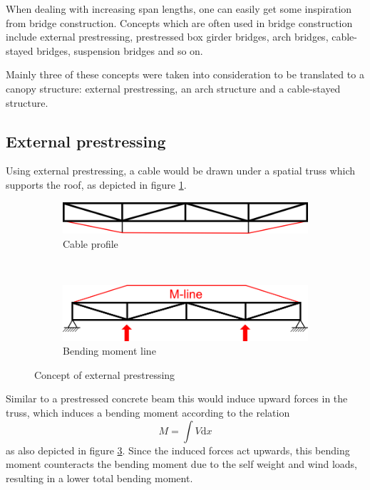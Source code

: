 \documentclass[a4paper]{article}
\begin{document}
When dealing with increasing span lengths, one can easily get some inspiration from bridge construction. Concepts which are often used in bridge construction include external prestressing, prestressed box girder bridges, arch bridges, cable-stayed bridges, suspension bridges and so on. 

Mainly three of these concepts were taken into consideration to be translated to a canopy structure: external prestressing, an arch structure and a cable-stayed structure.

\subsection{External prestressing}

Using external prestressing, a cable would be drawn under a spatial truss which supports the roof, as depicted in figure \ref{fig:prestressing}.

\begin{figure}[h]
\centering
\begin{subfigure}[b]{0.6\textwidth}
	\includegraphics[width=\textwidth]{prestressing}
	\caption{Cable profile}
	\label{fig:prestressing}
\end{subfigure}
\\[1cm]
\begin{subfigure}[b]{0.6\textwidth}
	\includegraphics[width=\textwidth]{prestressing-mline}
	\caption{Bending moment line}
	\label{fig:momentline}
\end{subfigure}
\caption{Concept of external prestressing}
\end{figure}

Similar to a prestressed concrete beam this would induce upward forces in the truss, which induces a bending moment according to the relation
\[
M = \int V \mathrm{d}x
\]
as also depicted in figure \ref{fig:momentline}. Since the induced forces act upwards, this bending moment counteracts the bending moment due to the self weight and wind loads, resulting in a lower total bending moment.
\end{document}
